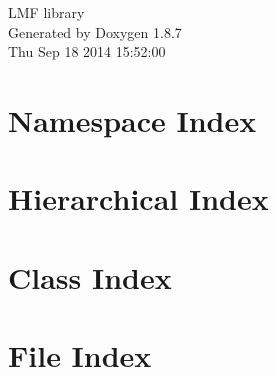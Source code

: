 \documentclass[twoside]{book}
\newcommand{\+}{\discretionary{\mbox{\scriptsize$\hookleftarrow$}}{}{}}
\newcommand{\clearemptydoublepage}{%
  \newpage{\pagestyle{empty}\cleardoublepage}%
}
\begin{document}
\hypersetup{pageanchor=false,
             bookmarks=true,
             bookmarksnumbered=true,
             pdfencoding=unicode
            }
\begin{titlepage}
\vspace*{7cm}
\begin{center}%
{\Large L\+M\+F library }\\
\vspace*{1cm}
{\large Generated by Doxygen 1.8.7}\\
\vspace*{0.5cm}
{\small Thu Sep 18 2014 15:52:00}\\
\end{center}
\end{titlepage}
\clearemptydoublepage
\tableofcontents
\clearemptydoublepage
{}
\hypersetup{pageanchor=true}

\chapter{Namespace Index}

\chapter{Hierarchical Index}

\chapter{Class Index}

\chapter{File Index}

\end{document}
